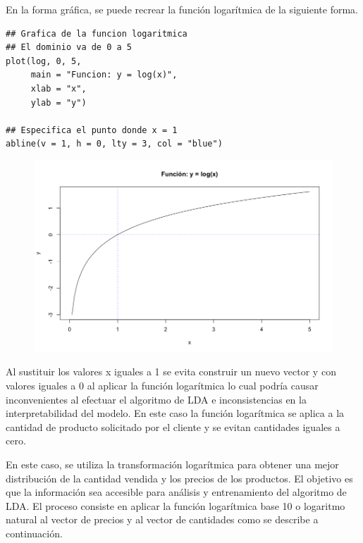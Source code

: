 \documentclass[letterpaper,12pt, spanish, oneside]{book} %
\begin{document}
En la forma gráfica, se puede recrear la función logarítmica de la siguiente forma.

\begin{lstlisting}
## Grafica de la funcion logaritmica
## El dominio va de 0 a 5
plot(log, 0, 5, 
     main = "Funcion: y = log(x)", 
     xlab = "x", 
     ylab = "y")

## Especifica el punto donde x = 1
abline(v = 1, h = 0, lty = 3, col = "blue")
\end{lstlisting}

\begin{figure}[H]
\centering
\includegraphics[width=1\textwidth]{log1.png}
\end{figure}

Al sustituir los valores x iguales a  1 se evita construir un nuevo vector y con valores iguales a 0 al aplicar la función logarítmica lo cual podría causar inconvenientes al efectuar el algoritmo de LDA e inconsistencias en la interpretabilidad del modelo. En este caso la función logarítmica se aplica a la cantidad de producto solicitado por el cliente y se evitan cantidades iguales a cero.

En este caso, se utiliza la transformación logarítmica para obtener una mejor distribución de la cantidad vendida y los precios de los productos. El objetivo es que la información sea accesible para análisis y entrenamiento del algoritmo de LDA. El proceso consiste en aplicar la función logarítmica base 10 o logaritmo natural al vector de precios y al vector de cantidades como se describe a continuación.
\end{document}
